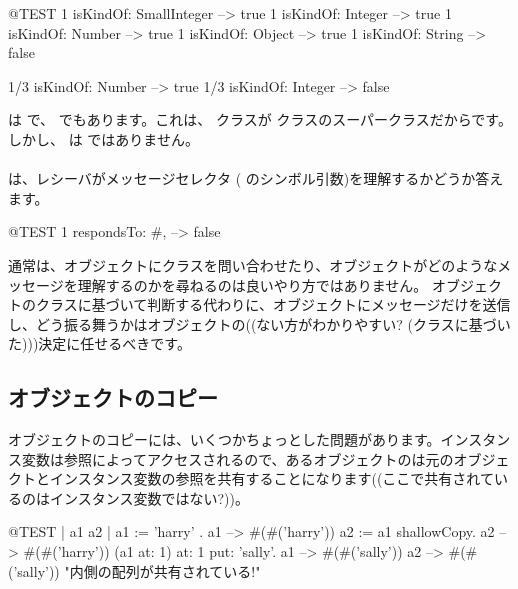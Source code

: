 \documentclass[a4paper,10pt,twoside]{book}
\begin{document}
\begin{code}{@TEST}
1 isKindOf: SmallInteger --> true
1 isKindOf: Integer          --> true
1 isKindOf: Number         --> true
1 isKindOf: Object           --> true
1 isKindOf: String            --> false

1/3 isKindOf: Number      --> true
1/3 isKindOf: Integer        --> false
\end{code}

 は  で、 でもあります。これは、 クラスが  クラスのスーパークラスだからです。しかし、 は  ではありません。

\paragraph{}
 は、レシーバがメッセージセレクタ ( のシンボル引数)を理解するかどうか答えます。

\begin{code}{@TEST}
1 respondsTo: #, --> false
\end{code}

通常は、オブジェクトにクラスを問い合わせたり、オブジェクトがどのようなメッセージを理解するのかを尋ねるのは良いやり方ではありません。
オブジェクトのクラスに基づいて判断する代わりに、オブジェクトにメッセージだけを送信し、どう振る舞うかはオブジェクトの((ない方がわかりやすい? (\ie クラスに基づいた)))決定に任せるべきです。

\subsection{オブジェクトのコピー}

オブジェクトのコピーには、いくつかちょっとした問題があります。インスタンス変数は参照によってアクセスされるので、あるオブジェクトのは元のオブジェクトとインスタンス変数の参照を共有することになります((ここで共有されているのはインスタンス変数ではない?))。

\begin{code}{@TEST | a1 a2 |}
a1 := { { 'harry' } }.
a1 --> #(#('harry'))
a2 := a1 shallowCopy.
a2 --> #(#('harry'))
(a1 at: 1) at: 1 put: 'sally'.
a1 --> #(#('sally'))
a2 --> #(#('sally'))    "内側の配列が共有されている!"
\end{code}
\end{document}
